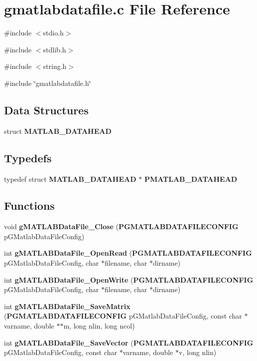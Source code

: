 \section{gmatlabdatafile.c File Reference}
\label{gmatlabdatafile_8c}
{\ttfamily \#include $<$stdio.h$>$}\par
{\ttfamily \#include $<$stdlib.h$>$}\par
{\ttfamily \#include $<$string.h$>$}\par
{\ttfamily \#include \char`\"{}gmatlabdatafile.h\char`\"{}}\par
\subsection*{Data Structures}
\begin{DoxyCompactItemize}
\item 
struct {\bf MATLAB\_\-DATAHEAD}
\end{DoxyCompactItemize}
\subsection*{Typedefs}
\begin{DoxyCompactItemize}
\item 
typedef struct {\bf MATLAB\_\-DATAHEAD} $\ast$ {\bf PMATLAB\_\-DATAHEAD}
\end{DoxyCompactItemize}
\subsection*{Functions}
\begin{DoxyCompactItemize}
\item 
void {\bf gMATLABDataFile\_\-Close} ({\bf PGMATLABDATAFILECONFIG} pGMatlabDataFileConfig)
\item 
int {\bf gMATLABDataFile\_\-OpenRead} ({\bf PGMATLABDATAFILECONFIG} pGMatlabDataFileConfig, char $\ast$filename, char $\ast$dirname)
\item 
int {\bf gMATLABDataFile\_\-OpenWrite} ({\bf PGMATLABDATAFILECONFIG} pGMatlabDataFileConfig, char $\ast$filename, char $\ast$dirname)
\item 
int {\bf gMATLABDataFile\_\-SaveMatrix} ({\bf PGMATLABDATAFILECONFIG} pGMatlabDataFileConfig, const char $\ast$varname, double $\ast$$\ast$m, long nlin, long ncol)
\item 
int {\bf gMATLABDataFile\_\-SaveVector} ({\bf PGMATLABDATAFILECONFIG} pGMatlabDataFileConfig, const char $\ast$varname, double $\ast$v, long nlin)
\end{DoxyCompactItemize}


